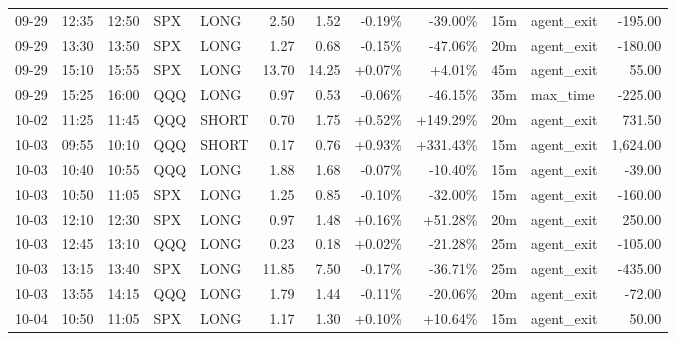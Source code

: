 \documentclass[11pt,a4paper]{article}
\begin{document}
\begin{center}
\begin{longtable}{>{\color{txtmain}}l l l l l r r r r r >{\color{txtmain}}l r}
09-29 & 12:35 & 12:50 & SPX & LONG & 2.50 & 1.52 & \textcolor{lossred}{-0.19\%} & \textcolor{lossred}{-39.00\%} & 15m & agent\_exit & \textcolor{lossred}{-195.00} \\
09-29 & 13:30 & 13:50 & SPX & LONG & 1.27 & 0.68 & \textcolor{lossred}{-0.15\%} & \textcolor{lossred}{-47.06\%} & 20m & agent\_exit & \textcolor{lossred}{-180.00} \\
09-29 & 15:10 & 15:55 & SPX & LONG & 13.70 & 14.25 & \textcolor{wingreen}{+0.07\%} & \textcolor{wingreen}{+4.01\%} & 45m & agent\_exit & \textcolor{wingreen}{55.00} \\
09-29 & 15:25 & 16:00 & QQQ & LONG & 0.97 & 0.53 & \textcolor{lossred}{-0.06\%} & \textcolor{lossred}{-46.15\%} & 35m & max\_time & \textcolor{lossred}{-225.00} \\
10-02 & 11:25 & 11:45 & QQQ & SHORT & 0.70 & 1.75 & \textcolor{wingreen}{+0.52\%} & \textcolor{wingreen}{+149.29\%} & 20m & agent\_exit & \textcolor{wingreen}{731.50} \\
10-03 & 09:55 & 10:10 & QQQ & SHORT & 0.17 & 0.76 & \textcolor{wingreen}{+0.93\%} & \textcolor{wingreen}{+331.43\%} & 15m & agent\_exit & \textcolor{wingreen}{1,624.00} \\
10-03 & 10:40 & 10:55 & QQQ & LONG & 1.88 & 1.68 & \textcolor{lossred}{-0.07\%} & \textcolor{lossred}{-10.40\%} & 15m & agent\_exit & \textcolor{lossred}{-39.00} \\
10-03 & 10:50 & 11:05 & SPX & LONG & 1.25 & 0.85 & \textcolor{lossred}{-0.10\%} & \textcolor{lossred}{-32.00\%} & 15m & agent\_exit & \textcolor{lossred}{-160.00} \\
10-03 & 12:10 & 12:30 & SPX & LONG & 0.97 & 1.48 & \textcolor{wingreen}{+0.16\%} & \textcolor{wingreen}{+51.28\%} & 20m & agent\_exit & \textcolor{wingreen}{250.00} \\
10-03 & 12:45 & 13:10 & QQQ & LONG & 0.23 & 0.18 & \textcolor{wingreen}{+0.02\%} & \textcolor{lossred}{-21.28\%} & 25m & agent\_exit & \textcolor{lossred}{-105.00} \\
10-03 & 13:15 & 13:40 & SPX & LONG & 11.85 & 7.50 & \textcolor{lossred}{-0.17\%} & \textcolor{lossred}{-36.71\%} & 25m & agent\_exit & \textcolor{lossred}{-435.00} \\
10-03 & 13:55 & 14:15 & QQQ & LONG & 1.79 & 1.44 & \textcolor{lossred}{-0.11\%} & \textcolor{lossred}{-20.06\%} & 20m & agent\_exit & \textcolor{lossred}{-72.00} \\
10-04 & 10:50 & 11:05 & SPX & LONG & 1.17 & 1.30 & \textcolor{wingreen}{+0.10\%} & \textcolor{wingreen}{+10.64\%} & 15m & agent\_exit & \textcolor{wingreen}{50.00} \\

\end{longtable}
\end{center}
\end{document}
